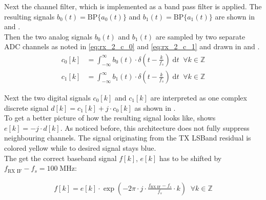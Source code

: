 Next the channel filter, which is implemented as a band pass filter is applied.
The resulting signals $b_0(t) = \text{BP}\{a_0(t)\}$ and
$b_1(t) = \text{BP}\{a_1(t)\}$ are shown in 
and . \\

Then the two analog signals $b_0(t)$ and $b_1(t)$ are sampled by two
separate \gls{ADC} channels as noted in \eqref{eq:rx_2_c_0} and
\eqref{eq:rx_2_c_1} and drawn in 
and . \\

\begin{subequations}
  \begin{alignat}{2}
    c_0[k] &= \int_{-\infty}^{\infty}
    b_0(t) \cdot \delta\left(t - \frac{k}{f_s}\right) \; \text{d}t
    \;\; \forall k \in \mathbb{Z}
    \label{eq:rx_2_c_0} \\
    c_1[k] &= \int_{-\infty}^{\infty}
    b_1(t) \cdot \delta\left(t - \frac{k}{f_s}\right) \; \text{d}t
    \;\; \forall k \in \mathbb{Z}
    \label{eq:rx_2_c_1}
  \end{alignat}
\end{subequations}

Next the two digital signals $c_0[k]$ and $c_1[k]$ are interpreted as one
complex discrete signal $d[k] = c_1[k] + j \cdot c_0[k]$ as shown in
. \\

To get a better picture of how the resulting signal looks like,
 shows $e[k] = -j \cdot d[k]$.
As noticed before, this architecture does not fully suppress neighbouring
channels. The signal originating from the \gls{TX} \gls{LSBand} residual is
colored yellow while to desired signal stays blue. \\

The get the correct baseband signal $f[k]$, $e[k]$ has to be shifted by
$f_{\text{RX IF}} - f_s = 100 \; \text{MHz}$:

\begin{align}
  f[k] = e[k] \cdot \exp\left(-2\pi \cdot j \cdot
  \frac{f_{\text{RX IF}} - f_s}{f_s} \cdot k \right)
  \;\; \forall k \in \mathbb{Z}
\end{align}


